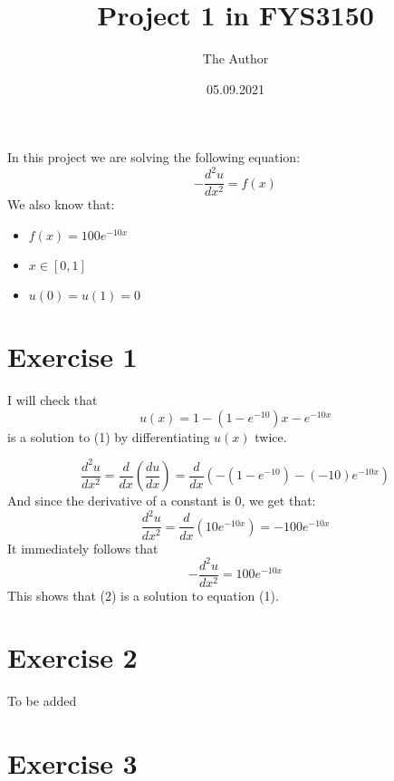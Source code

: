 \documentclass[11pt]{article} %
\title{Project 1 in FYS3150 }
\author{The Author}
\date{05.09.2021} %
\begin{document}
\maketitle
In this project we are solving the following equation:
\begin{equation} - \dfrac{d^2u}{dx^2} = f(x) \end{equation}
We also know that:
\begin{itemize}
	\item \(f(x) = 100e^{-10x}\)
	\item \(x \in [0, 1]\)
	\item \(u(0)=u(1)=0\)
\end{itemize}

\section*{Exercise 1}


I will check that 
\begin{equation}  u(x) = 1 - (1- e^{-10})x -e^{-10x} \end{equation}
is a solution to (1) by differentiating \(u(x)\) twice. 

\[\dfrac{d^2u}{dx^2} =\dfrac{d}{dx}(\dfrac{du}{dx}) = \dfrac{d}{dx}( -(1 - e^{-10}) - (-10)e^{-10x})\]
And since the derivative of a constant is 0, we get that: 
\[\dfrac{d^2u}{dx^2} = \dfrac{d}{dx}(10e^{-10x}) = -100e^{-10x}\]
It immediately follows that
\[ - \dfrac{d^2u}{dx^2} = 100e^{-10x}\]
This shows that (2) is a solution to equation (1).

\section*{Exercise 2}

To be added

\section*{Exercise 3}
\end{document}
